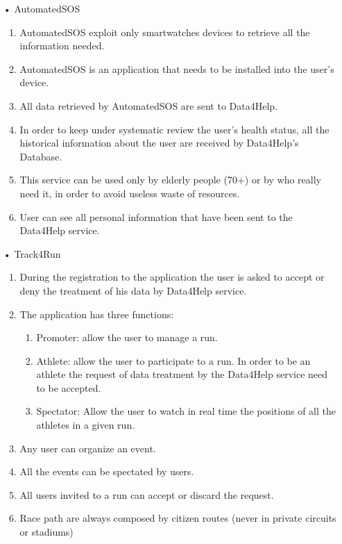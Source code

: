 \begin{enumerate}
\item[•] {\Large AutomatedSOS}
	\begin{enumerate}
	\item AutomatedSOS exploit only smartwatches devices to retrieve all the information needed.
	\item AutomatedSOS is an application that needs to be installed into the user's device.
	\item All data retrieved by AutomatedSOS are sent to Data4Help.
	\item In order to keep under systematic review the user's health status, all the historical information about the user are received by Data4Help's Database.
    \item This service can be used only by elderly people (70+) or by who really need it, in order to avoid useless waste of resources.
    \item User can see all personal information that have been sent to the Data4Help service. 
	\end{enumerate}
	
\item[•] {\Large Track4Run}
	\begin{enumerate}
	\item During the registration to the application the user is asked to accept or deny the treatment of his data by  Data4Help service.
	\item The application has three functions: 
	\begin{enumerate}
	\item Promoter: allow the user to manage a run.  
	\item Athlete: allow the user to participate to a run. In order to be an athlete the request of data treatment by the Data4Help service need to be accepted.
	\item Spectator: Allow the user to watch in real time the positions of all the athletes in a given run.
	\end{enumerate}
	\item Any user can organize an event.
    \item All the events can be spectated by users.
    \item All users invited to a run can accept or discard the request.
    \item Race path are always composed by citizen routes (never in private circuits or stadiums)
    \end{enumerate}
\end{enumerate}

